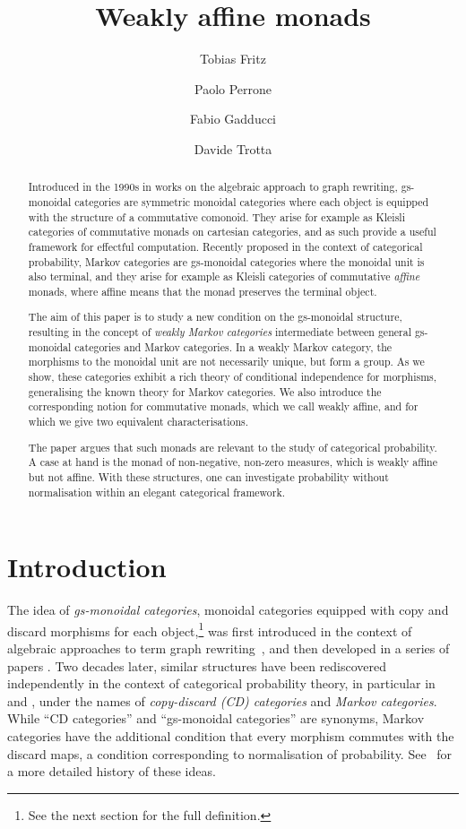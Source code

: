 \documentclass[a4paper,UKenglish,numberwithinsect,cleveref, autoref, thm-restate]{lipics-v2021}
\title{Weakly affine monads}
\author{Tobias Fritz}{Department of Mathematics, University of Innsbruck, AT}{tobias.fritz@uibk.ac.at}{}{}
\author{Paolo Perrone}{Department of Computer Science, University of Oxford, UK}{paolo.perrone@cs.ox.ac.uk}{https://orcid.org/0000-0002-9123-9089}{}
\author{Fabio Gadducci}{Department of Computer Science, University of Pisa, Pisa, IT}{fabio.gadducci@unipi.it}{https://orcid.org/
0000-0003-0690-3051}{MIUR PRIN 2017FTXR ``IT-MaTTerS''.}
\author{ Davide Trotta }{Department of Computer Science, University of Pisa, Pisa, IT}{trottadavide92@gmail.com}{https://orcid.org/0000-0003-4509-594X}{MIUR PRIN 2017FTXR ``IT-MaTTerS''.}
\theoremstyle{plain} %
\theoremstyle{definition} %
\begin{document}
\maketitle

\begin{abstract}
   Introduced in the 1990s in works on the algebraic approach to graph rewriting, 
   gs-monoidal categories are symmetric monoidal categories 
   where each object is equipped with the structure of a commutative comonoid. They arise for example as 
   Kleisli categories of commutative monads on cartesian categories, 
   and as such provide a useful framework for effectful computation. 
   Recently proposed in the context of categorical probability, Markov categories are
   gs-monoidal categories where the monoidal unit is also terminal, and they arise for example as
   Kleisli categories of commutative \emph{affine} monads, where affine means that the monad preserves the terminal object.

   The aim of this paper is to study a new condition on the gs-monoidal structure, resulting in the concept of \emph{weakly Markov categories} intermediate between general 
   gs-monoidal categories and Markov categories. 
   In a weakly Markov category, the morphisms to the monoidal unit are not necessarily unique, but form a group.
   As we show, these categories exhibit a 
   rich theory of conditional independence for morphisms, generalising the known theory for Markov categories. We also introduce the corresponding 
   notion for commutative monads, which we call weakly affine, and for which we give two equivalent
   characterisations.

   The paper argues that such monads are relevant to the study of categorical probability.
   A case at hand is the monad of non-negative, non-zero measures, which is weakly affine but not affine. 
   With these structures, one can investigate probability without normalisation within an elegant categorical framework.
\end{abstract}

\section{Introduction}

The idea of \emph{gs-monoidal categories}, monoidal categories equipped with copy and discard morphisms for each object,\footnote{See the next section for the full definition.} was first introduced in the context of algebraic approaches to term graph rewriting~\cite{CorradiniGadducci97}, and then
developed in a series of papers \cite{CorradiniGadducci99, CorradiniGadducci02, CorradiniGadducci99b}.
Two decades later, similar structures have been rediscovered independently in the context of categorical probability theory, in particular in \cite{cho_jacobs_2019} and \cite{Fritz_2020}, under the names of \emph{copy-discard (CD) categories} and \emph{Markov categories}.
While ``CD categories'' and ``gs-monoidal categories'' are synonyms, Markov categories have the additional condition that every morphism commutes with the discard maps, a condition corresponding to normalisation of probability. See~\cite[Remark~2.2]{fritz2022} for a more detailed history of these ideas. 
\end{document}
